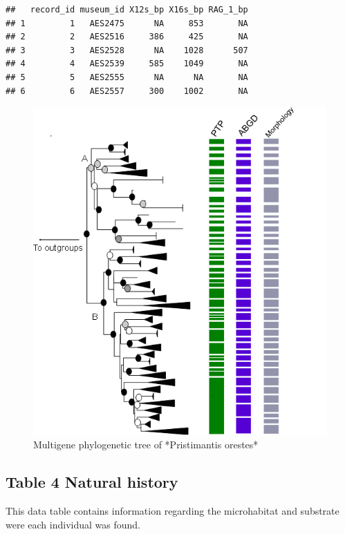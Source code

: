 \documentclass[
]{book}
\begin{document}
\begin{verbatim}
##   record_id museum_id X12s_bp X16s_bp RAG_1_bp
## 1         1   AES2475      NA     853       NA
## 2         2   AES2516     386     425       NA
## 3         3   AES2528      NA    1028      507
## 4         4   AES2539     585    1049       NA
## 5         5   AES2555      NA      NA       NA
## 6         6   AES2557     300    1002       NA
\end{verbatim}

\begin{figure}

{\centering \includegraphics[width=7.01in,height=2\textheight]{figure3} 

}

\caption{Multigene phylogenetic tree of *Pristimantis orestes*}\label{fig:plot3}
\end{figure}

\hypertarget{table-4-natural-history}{%
\subsection{Table 4 Natural history}\label{table-4-natural-history}}

This data table contains information regarding the microhabitat and substrate were each individual was found.
\end{document}
